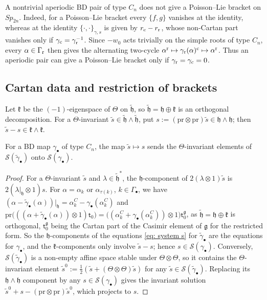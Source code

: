 \documentclass[a4paper]{amsart}
\numberwithin{equation}{section}
\theoremstyle{definition}
\theoremstyle{remark}
\newcommand{\mfh}{\mathfrak{h}}
\newcommand{\mfg}{\mathfrak{g}}
\newcommand{\mfk}{\mathfrak{k}}
\newcommand{\mcS}{\mathcal{S}}
\newcommand{\tg}{\widetilde{\gamma}}
\newcommand{\Vt}{\Theta}
\newcommand{\rr}{{\rm r}}
\newcommand{\cc}{{\rm c}}
\newcommand{\pr}{\mathrm{pr}}
\newcommand{\Cas}{\mathsf t}
\newcommand{\Sp}{Sp_{2n}}
\begin{document}
\begin{remark}
  \label{rmk: aperiodic not PL}
  A nontrivial aperiodic BD pair of type $C_n$ does not give a Poisson--Lie bracket on $\Sp$.
  Indeed, for a Poisson--Lie bracket every $\{f,g\}$ vanishes at the identity, whereas at the identity $\{\cdot,\cdot\}_{\gamma,s}$ is given by $r_\cc-r_\rr$, whose non-Cartan part vanishes only if $\gamma_{\cc}=\gamma_{\rr}^{-1}$.
  Since $-w_0$ acts trivially on the simple roots of type $C_n$, every $\alpha\in\Gamma_{\rr}$ then gives the alternating two-cycle $\alpha^\rr\mapsto\gamma_{\rr}(\alpha)^\cc\mapsto\alpha^\rr$.
  Thus an aperiodic pair can give a Poisson--Lie bracket only if $\gamma_{\rr}=\gamma_{\cc}=0$.
\end{remark}

\subsection{Cartan data and restriction of brackets}
Let $\mfk$ be the $(-1)$-eigenspace of $\Vt$ on $\widetilde{\mfh}$, so $\widetilde{\mfh}=\mfh\oplus\mfk$ is an orthogonal decomposition.
For a $\Vt$-invariant $\widetilde{s}\in\widetilde{\mfh}\wedge\widetilde{\mfh}$, put $s:=(\pr\otimes\pr)\widetilde{s}\in\mfh\wedge\mfh$; then $\widetilde{s}-s\in\mfk\wedge\mfk$.

\begin{proposition}
  \label{prop: cartan}
  For a BD map $\gamma_\bullet$ of type $C_n$, the map $\widetilde{s}\mapsto s$ sends the $\Vt$-invariant elements of $\mcS(\tg_\bullet)$ onto $\mcS(\gamma_\bullet)$.
\end{proposition}
\begin{proof}

  For a $\Vt$-invariant $\widetilde{s}$ and $\lambda\in\widetilde{\mfh}^*$, the $\mfh$-component of $2(\lambda\otimes1)\widetilde{s}$ is $2(\lambda|_\mfh\otimes1)s$.
  For $\alpha=\alpha_k$ or $\alpha_{\tau(k)}$, $k\in\Gamma_\bullet$, we have $(\alpha-\tg_\bullet(\alpha))|_\mfh=\alpha^C_k-\gamma_\bullet(\alpha^C_k)$ and $\pr\big(((\alpha+\tg_\bullet(\alpha))\otimes1)\Cas_0\big)=\big((\alpha^C_k+\gamma_\bullet(\alpha^C_k))\otimes1\big)\Cas^\mfg_0$, as $\widetilde{\mfh}=\mfh\oplus\mfk$ is orthogonal, $\Cas^\mfg_0$ being the Cartan part of the Casimir element of $\mfg$ for the restricted form.
  So the $\mfh$-components of the equations \eqref{eq: system s} for $\tg_\bullet$ are the equations for $\gamma_\bullet$, and the $\mfk$-components only involve $\widetilde{s}-s$; hence $s\in\mcS(\gamma_\bullet)$.
  Conversely, $\mcS(\tg_\bullet)$ is a non-empty affine space stable under $\Vt\otimes\Vt$, so it contains the $\Vt$-invariant element $\widetilde{s}^0:=\frac12(\widetilde{s}+(\Vt\otimes\Vt)\widetilde{s})$ for any $\widetilde{s}\in\mcS(\tg_\bullet)$.
  Replacing its $\mfh\wedge\mfh$ component by any $s\in\mcS(\gamma_\bullet)$ gives the invariant solution $\widetilde{s}^0+s-(\pr\otimes\pr)\widetilde{s}^0$, which projects to $s$.
\end{proof}
\end{document}
